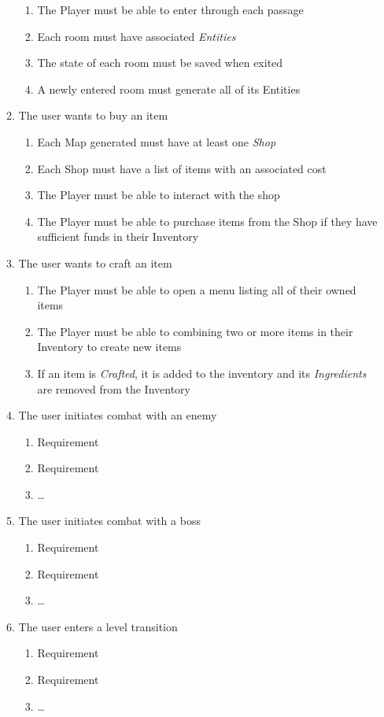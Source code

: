 \documentclass[12pt, titlepage]{article}
\begin{document}
\begin{enumerate}[{VP}1.]
\begin{enumerate}[{BE1}.1]
\begin{enumerate}
      \item The Player must be able to enter through each passage
      \item Each room must have associated \textit{Entities}
      \item The state of each room must be saved when exited
      \item A newly entered room must generate all of its Entities
    \end{enumerate}
    \item The user wants to buy an item
    \begin{enumerate}
      \item Each Map generated must have at least one \textit{Shop}
      \item Each Shop must have a list of items with an associated cost
      \item The Player must be able to interact with the shop
      \item The Player must be able to purchase items from the Shop if they have sufficient funds in their Inventory
    \end{enumerate}
    \item The user wants to craft an item
    \begin{enumerate}
      \item The Player must be able to open a menu listing all of their owned items
      \item The Player must be able to combining two or more items in their Inventory to create new items
      \item If an item is \textit{Crafted}, it is added to the inventory and its \textit{Ingredients} are removed from the Inventory
    \end{enumerate}
    \item The user initiates combat with an enemy
    \begin{enumerate}
      \item Requirement
      \item Requirement
      \item \dots
    \end{enumerate}
    \item The user initiates combat with a boss
    \begin{enumerate}
      \item Requirement
      \item Requirement
      \item \dots
    \end{enumerate}
    \item The user enters a level transition
    \begin{enumerate}
      \item Requirement
      \item Requirement
      \item \dots
    \end{enumerate}
  \end{enumerate}
\end{enumerate}
\end{document}
